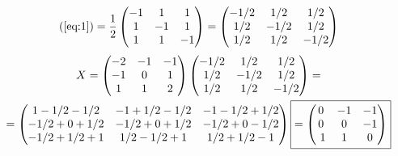 \documentclass[a4paper]{article}
\theoremstyle{definition}
\theoremstyle{plain}
\begin{document}
\begin{equation*}
  (\ref{eq:1}) =
  \frac{1}{2}
  \begin{pmatrix}
    -1 & 1 & 1\\
    1 & -1 & 1\\
    1 & 1 & -1
  \end{pmatrix}
  =
  \begin{pmatrix}
    -1/2 & 1/2 & 1/2\\
    1/2 & -1/2 & 1/2\\
    1/2 & 1/2 & -1/2
  \end{pmatrix}
\end{equation*}
\begin{multline*}
  X =
  \begin{pmatrix}
    -2 & -1 & -1\\
    -1 & 0 & 1\\
    1 & 1 & 2
  \end{pmatrix}
  \begin{pmatrix}
    -1/2 & 1/2 & 1/2\\
    1/2 & -1/2 & 1/2\\
    1/2 & 1/2 & -1/2
  \end{pmatrix}
  =\\
  =
  \begin{pmatrix}
    1 - 1/2 - 1/2 & -1 + 1/2 - 1/2 & -1 - 1/2 + 1/2\\
    -1/2 + 0 + 1/2 & -1/2 + 0 + 1/2 & -1/2 + 0 - 1/2\\
    -1/2 + 1/2 + 1 & 1/2 - 1/2 + 1 & 1/2 + 1/2 - 1
  \end{pmatrix}
  \fbox{$=
    \begin{pmatrix} 0 & -1 & -1\\
      0 & 0 & -1\\\
      1 & 1 & 0
    \end{pmatrix}$}
\end{multline*}
\end{document}
